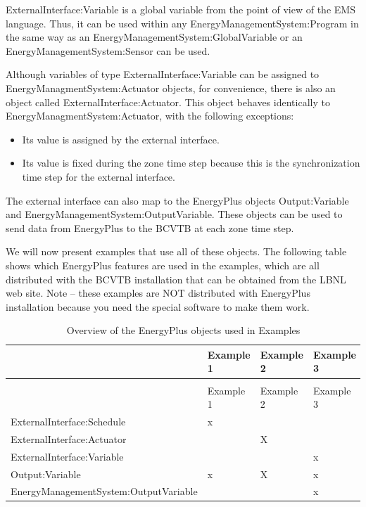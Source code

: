 ExternalInterface:Variable is a global variable from the point of view of the EMS language. Thus, it can be used within any EnergyManagementSystem:Program in the same way as an EnergyManagementSystem:GlobalVariable or an EnergyManagementSystem:Sensor can be used.

Although variables of type ExternalInterface:Variable can be assigned to EnergyManagmentSystem:Actuator objects, for convenience, there is also an object called ExternalInterface:Actuator. This object behaves identically to EnergyManagmentSystem:Actuator, with the following exceptions:

\begin{itemize}
\item
  Its value is assigned by the external interface.
\item
  Its value is fixed during the zone time step because this is the synchronization time step for the external interface.
\end{itemize}

The external interface can also map to the EnergyPlus objects Output:Variable and EnergyManagementSystem:OutputVariable. These objects can be used to send data from EnergyPlus to the BCVTB at each zone time step.

We will now present examples that use all of these objects. The following table shows which EnergyPlus features are used in the examples, which are all distributed with the BCVTB installation that can be obtained from the LBNL web site. Note -- these examples are NOT distributed with EnergyPlus installation because you need the special software to make them work.

\begin{longtable}[c]{@{}llll@{}}
\caption{Overview of the EnergyPlus objects used in Examples \label{table:overview-of-the-energyplus-objects-used-in}} \tabularnewline
\toprule
~ & Example 1 & Example 2 & Example 3 \tabularnewline
\midrule
\endfirsthead

\caption[]{Overview of the EnergyPlus objects used in Examples} \tabularnewline
\toprule
~ & Example 1 & Example 2 & Example 3 \tabularnewline
\midrule
\endhead

ExternalInterface:Schedule & x & ~ & ~ \tabularnewline
ExternalInterface:Actuator & ~ & X & ~ \tabularnewline
ExternalInterface:Variable & ~ & ~ & x \tabularnewline
Output:Variable & x & X & x \tabularnewline
EnergyManagementSystem:OutputVariable & ~ & ~ & x \tabularnewline
\bottomrule
\end{longtable}

